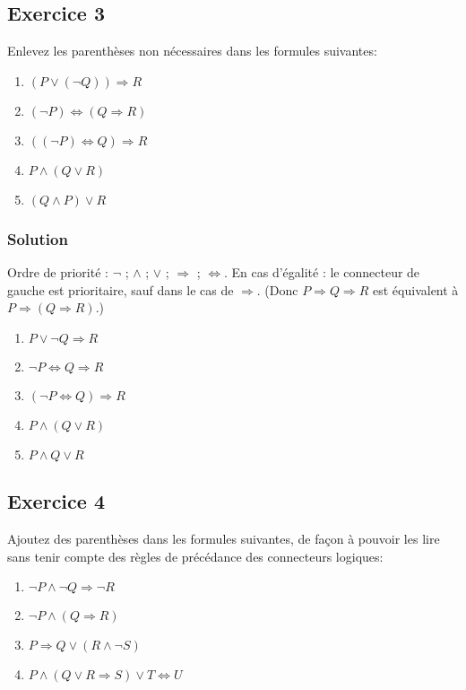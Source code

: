 \subsection*{Exercice 3}
Enlevez les parenthèses non nécessaires dans les formules suivantes:
\begin{enumerate}
	\item $(P \lor (\neg Q)) \Rightarrow R$
	\item $(\neg P) \Leftrightarrow (Q \Rightarrow R)$
	\item $((\neg P) \Leftrightarrow Q) \Rightarrow R$
	\item $P \land (Q \lor R)$
	\item $(Q \land P) \lor R$
\end{enumerate}


\subsubsection*{Solution}
    Ordre de priorité : $\neg$ ; $\land$ ; $\lor$ ; $\Rightarrow$ ; $\Leftrightarrow$.
    En cas d'égalité : le connecteur de gauche est prioritaire, sauf dans le cas de $\Rightarrow$.
    (Donc $P \Rightarrow Q \Rightarrow R$ est équivalent à $P \Rightarrow (Q \Rightarrow R)$.)
    
    \begin{enumerate}
        \item $P \lor \neg Q \Rightarrow R$
        \item $\neg P \Leftrightarrow Q \Rightarrow R$
        \item $(\neg P \Leftrightarrow Q) \Rightarrow R$
        \item $P \land (Q \lor R)$
        \item $P \land Q \lor R$
    \end{enumerate}

\subsection*{Exercice 4}
Ajoutez des parenthèses dans les formules suivantes, de façon à pouvoir
les lire sans tenir compte des règles de précédance des connecteurs logiques:
\begin{enumerate}
	\item $\neg P \land \neg Q \Rightarrow \neg R$
	\item $\neg P \land (Q \Rightarrow R)$
	\item $P \Rightarrow Q \lor (R \land \neg S)$
	\item $P \land (Q \lor R \Rightarrow S) \lor T \Leftrightarrow U$
\end{enumerate}


